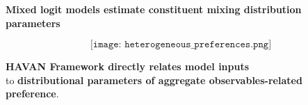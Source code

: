 \documentclass{article}
\begin{document}
\textbf{Mixed logit models estimate constituent mixing distribution parameters}

\begin{equation*}
\texttt{[image: heterogeneous\_preferences.png]}
\end{equation*}

\noindent \textbf{HAVAN Framework directly relates model inputs} \\
to \textbf{distributional parameters of aggregate observables-related preference}.
\end{document}
